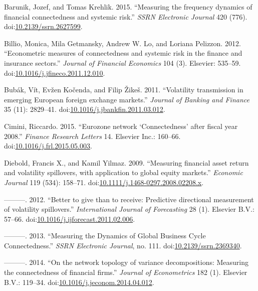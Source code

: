 \documentclass[]{elsarticle} %
\begin{document}
\hypertarget{ref-Barunik2015}{}
Barunik, Jozef, and Tomas Krehlik. 2015. ``Measuring the frequency
dynamics of financial connectedness and systemic risk.'' \emph{SSRN
Electronic Journal} 420 (776).
doi:\href{https://doi.org/10.2139/ssrn.2627599}{10.2139/ssrn.2627599}.

\hypertarget{ref-Billio2012}{}
Billio, Monica, Mila Getmansky, Andrew W. Lo, and Loriana Pelizzon.
2012. ``Econometric measures of connectedness and systemic risk in the
finance and insurance sectors.'' \emph{Journal of Financial Economics}
104 (3). Elsevier: 535--59.
doi:\href{https://doi.org/10.1016/j.jfineco.2011.12.010}{10.1016/j.jfineco.2011.12.010}.

\hypertarget{ref-Bubak2011}{}
Bubák, Vít, Evžen Kočenda, and Filip Žikeš. 2011. ``Volatility
transmission in emerging European foreign exchange markets.''
\emph{Journal of Banking and Finance} 35 (11): 2829--41.
doi:\href{https://doi.org/10.1016/j.jbankfin.2011.03.012}{10.1016/j.jbankfin.2011.03.012}.

\hypertarget{ref-Cimini2015}{}
Cimini, Riccardo. 2015. ``Eurozone network `Connectedness' after fiscal
year 2008.'' \emph{Finance Research Letters} 14. Elsevier Inc.: 160--66.
doi:\href{https://doi.org/10.1016/j.frl.2015.05.003}{10.1016/j.frl.2015.05.003}.

\hypertarget{ref-Diebold2009}{}
Diebold, Francis X., and Kamil Yilmaz. 2009. ``Measuring financial asset
return and volatility spillovers, with application to global equity
markets.'' \emph{Economic Journal} 119 (534): 158--71.
doi:\href{https://doi.org/10.1111/j.1468-0297.2008.02208.x}{10.1111/j.1468-0297.2008.02208.x}.

\hypertarget{ref-Diebold2012}{}
---------. 2012. ``Better to give than to receive: Predictive
directional measurement of volatility spillovers.'' \emph{International
Journal of Forecasting} 28 (1). Elsevier B.V.: 57--66.
doi:\href{https://doi.org/10.1016/j.ijforecast.2011.02.006}{10.1016/j.ijforecast.2011.02.006}.

\hypertarget{ref-Diebold2013}{}
---------. 2013. ``Measuring the Dynamics of Global Business Cycle
Connectedness.'' \emph{SSRN Electronic Journal}, no. 111.
doi:\href{https://doi.org/10.2139/ssrn.2369340}{10.2139/ssrn.2369340}.

\hypertarget{ref-Diebold2014}{}
---------. 2014. ``On the network topology of variance decompositions:
Measuring the connectedness of financial firms.'' \emph{Journal of
Econometrics} 182 (1). Elsevier B.V.: 119--34.
doi:\href{https://doi.org/10.1016/j.jeconom.2014.04.012}{10.1016/j.jeconom.2014.04.012}.
\end{document}
